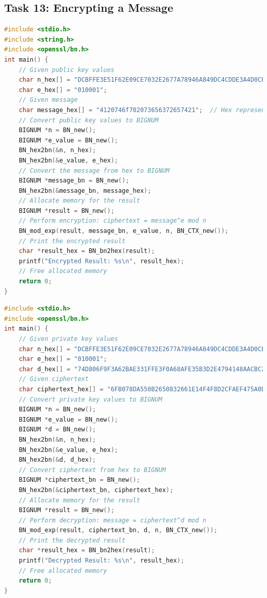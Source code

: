\documentclass[a4paper,11pt]{article}
\begin{document}
\subsection{Task 13: Encrypting a Message}
\begin{lstlisting}[caption={C Program Code for Encrypt},label={lst:task4.13-1},language=C,breaklines=true]
#include <stdio.h>
#include <string.h>
#include <openssl/bn.h>
int main() {
    // Given public key values
    char n_hex[] = "DCBFFE3E51F62E09CE7032E2677A78946A849DC4CDDE3A4D0CB81629242FB1A5";
    char e_hex[] = "010001";
    // Given message
    char message_hex[] = "4120746f702073656372657421";  // Hex representation of "A top secret!"
    // Convert public key values to BIGNUM
    BIGNUM *n = BN_new();
    BIGNUM *e_value = BN_new();
    BN_hex2bn(&n, n_hex);
    BN_hex2bn(&e_value, e_hex);
    // Convert the message from hex to BIGNUM
    BIGNUM *message_bn = BN_new();
    BN_hex2bn(&message_bn, message_hex);
    // Allocate memory for the result
    BIGNUM *result = BN_new();
    // Perform encryption: ciphertext = message^e mod n
    BN_mod_exp(result, message_bn, e_value, n, BN_CTX_new());
    // Print the encrypted result
    char *result_hex = BN_bn2hex(result);
    printf("Encrypted Result: %s\n", result_hex);
    // Free allocated memory
    return 0;
}

\end{lstlisting}
\begin{lstlisting}[caption={C Program Code for Evaluation},label={lst:task4.13-2},language=C,breaklines=true]
#include <stdio.h>
#include <openssl/bn.h>
int main() {
    // Given private key values
    char n_hex[] = "DCBFFE3E51F62E09CE7032E2677A78946A849DC4CDDE3A4D0CB81629242FB1A5";
    char e_hex[] = "010001";
    char d_hex[] = "74D806F9F3A62BAE331FFE3F0A68AFE35B3D2E4794148AACBC26AA381CD7D30D";
    // Given ciphertext
    char ciphertext_hex[] = "6FB078DA550B2650832661E14F4F8D2CFAEF475A0DF3A75CACDC5DE5CFC5FADC";
    // Convert private key values to BIGNUM
    BIGNUM *n = BN_new();
    BIGNUM *e_value = BN_new();
    BIGNUM *d = BN_new();
    BN_hex2bn(&n, n_hex);
    BN_hex2bn(&e_value, e_hex);
    BN_hex2bn(&d, d_hex);
    // Convert ciphertext from hex to BIGNUM
    BIGNUM *ciphertext_bn = BN_new();
    BN_hex2bn(&ciphertext_bn, ciphertext_hex);
    // Allocate memory for the result
    BIGNUM *result = BN_new();
    // Perform decryption: message = ciphertext^d mod n
    BN_mod_exp(result, ciphertext_bn, d, n, BN_CTX_new());
    // Print the decrypted result
    char *result_hex = BN_bn2hex(result);
    printf("Decrypted Result: %s\n", result_hex);
    // Free allocated memory
    return 0;
}
\end{lstlisting} 
\end{document}
